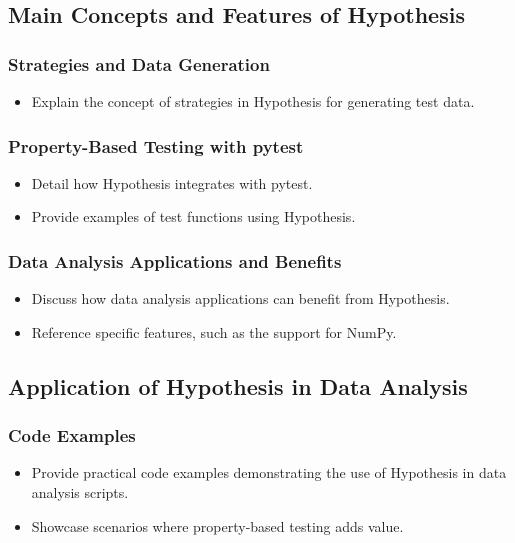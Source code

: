 \documentclass[runningheads]{llncs}
\begin{document}
\subsection{Main Concepts and Features of Hypothesis}
\subsubsection{Strategies and Data Generation}
\begin{itemize}
  \item Explain the concept of strategies in Hypothesis for generating test data.
\end{itemize}

\subsubsection{Property-Based Testing with pytest}
\begin{itemize}
  \item Detail how Hypothesis integrates with pytest.
  \item Provide examples of test functions using Hypothesis.
\end{itemize}

\subsubsection{Data Analysis Applications and Benefits}
\begin{itemize}
  \item Discuss how data analysis applications can benefit from Hypothesis.
  \item Reference specific features, such as the support for NumPy.
\end{itemize}

\subsection{Application of Hypothesis in Data Analysis}
\subsubsection{Code Examples}
\begin{itemize}
  \item Provide practical code examples demonstrating the use of Hypothesis in data analysis scripts.
  \item Showcase scenarios where property-based testing adds value.
\end{itemize}
\end{document}
